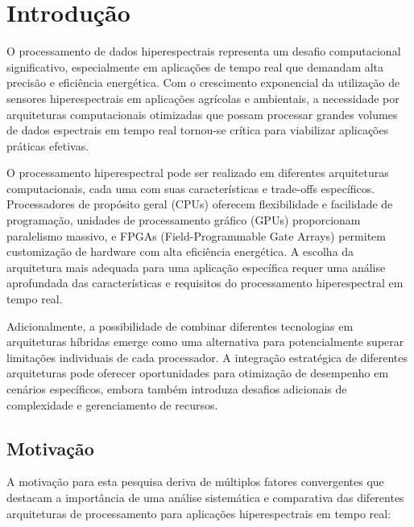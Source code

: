 \chapter{Introdução}\label{chp:Introducao}

O processamento de dados hiperespectrais representa um desafio computacional significativo, especialmente em aplicações de tempo real que demandam alta precisão e eficiência energética. Com o crescimento exponencial da utilização de sensores hiperespectrais em aplicações agrícolas e ambientais, a necessidade por arquiteturas computacionais otimizadas que possam processar grandes volumes de dados espectrais em tempo real tornou-se crítica para viabilizar aplicações práticas efetivas.

O processamento hiperespectral pode ser realizado em diferentes arquiteturas computacionais, cada uma com suas características e trade-offs específicos. Processadores de propósito geral (CPUs) oferecem flexibilidade e facilidade de programação, unidades de processamento gráfico (GPUs) proporcionam paralelismo massivo, e FPGAs (Field-Programmable Gate Arrays) permitem customização de hardware com alta eficiência energética. A escolha da arquitetura mais adequada para uma aplicação específica requer uma análise aprofundada das características e requisitos do processamento hiperespectral em tempo real.

Adicionalmente, a possibilidade de combinar diferentes tecnologias em arquiteturas híbridas emerge como uma alternativa para potencialmente superar limitações individuais de cada processador. A integração estratégica de diferentes arquiteturas pode oferecer oportunidades para otimização de desempenho em cenários específicos, embora também introduza desafios adicionais de complexidade e gerenciamento de recursos.

\section{Motivação}\label{sec:motivacao}

A motivação para esta pesquisa deriva de múltiplos fatores convergentes que destacam a importância de uma análise sistemática e comparativa das diferentes arquiteturas de processamento para aplicações hiperespectrais em tempo real:

